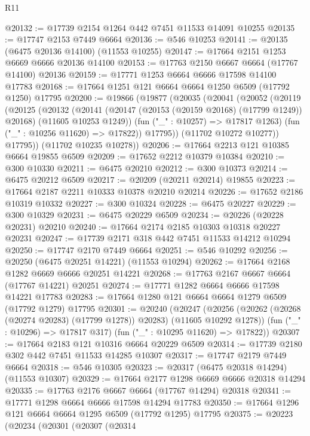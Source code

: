 \begin{lexlean}{R11}
\begin{coremodule}
{{{{{{{{{{{{{{{{{{{{{{{{{{{{{{{{{{{{{{{{{{{{{{{{{{{{{{{{{{{{{{{{{{{{{{{{{{{{{{{{{{@20132 := @17739 @2154 @1264 @442 @7451 @11533 @14091 @10255
@20135 := @17747 @2153 @7449 @6664
@20136 := @546 @10253
@20141 := @20135 (@6475 @20136 @14100) (@11553 @10255)
@20147 := @17664 @2151 @1253 @6669 @6666 @20136 @14100
@20153 := @17763 @2150 @6667 @6664 (@17767 @14100) @20136
@20159 := @17771 @1253 @6664 @6666 @17598 @14100 @17783
@20168 := @17664 @1251 @121 @6664 @6664 @1250 @6509 (@17792 @1250) @17795
@20200 := @19866
    (@19877
      (@20035
        (@20041
          (@20052
            (@20119
              (@20125
                (@20132
                  (@20141
                    (@20147 (@20153 (@20159 @20168) (@17799 @1249)) @20168)
                    (@11605 @10253 @1249))
                  (fun ("_" : @10257) => @17817 @1263)
                  (fun ("_" : @10256 @11620) => @17822))
                @17795))
            (@11702 @10272 @10277))
          @17795))
      (@11702 @10235 @10278))
@20206 := @17664 @2213 @121 @10385 @6664 @19855 @6509
@20209 := @17652 @2212 @10379 @10384
@20210 := @300 @10330
@20211 := @6475 @20210
@20212 := @300 @10373
@20214 := @6475 @20212 @6509
@20217 := @20209 (@20211 @20214) @19855
@20223 := @17664 @2187 @2211 @10333 @10378 @20210 @20214
@20226 := @17652 @2186 @10319 @10332
@20227 := @300 @10324
@20228 := @6475 @20227
@20229 := @300 @10329
@20231 := @6475 @20229 @6509
@20234 := @20226 (@20228 @20231) @20210
@20240 := @17664 @2174 @2185 @10303 @10318 @20227 @20231
@20247 := @17739 @2171 @318 @442 @7451 @11533 @14212 @10294
@20250 := @17747 @2170 @7449 @6664
@20251 := @546 @10292
@20256 := @20250 (@6475 @20251 @14221) (@11553 @10294)
@20262 := @17664 @2168 @1282 @6669 @6666 @20251 @14221
@20268 := @17763 @2167 @6667 @6664 (@17767 @14221) @20251
@20274 := @17771 @1282 @6664 @6666 @17598 @14221 @17783
@20283 := @17664 @1280 @121 @6664 @6664 @1279 @6509 (@17792 @1279) @17795
@20301 := @20240
    (@20247
      (@20256 (@20262 (@20268 (@20274 @20283) (@17799 @1278)) @20283) (@11605 @10292 @1278))
      (fun ("_" : @10296) => @17817 @317)
      (fun ("_" : @10295 @11620) => @17822))
@20307 := @17664 @2183 @121 @10316 @6664 @20229 @6509
@20314 := @17739 @2180 @302 @442 @7451 @11533 @14285 @10307
@20317 := @17747 @2179 @7449 @6664
@20318 := @546 @10305
@20323 := @20317 (@6475 @20318 @14294) (@11553 @10307)
@20329 := @17664 @2177 @1298 @6669 @6666 @20318 @14294
@20335 := @17763 @2176 @6667 @6664 (@17767 @14294) @20318
@20341 := @17771 @1298 @6664 @6666 @17598 @14294 @17783
@20350 := @17664 @1296 @121 @6664 @6664 @1295 @6509 (@17792 @1295) @17795
@20375 := @20223
    (@20234
      (@20301
        (@20307
          (@20314
}}}}}}}}}}}}}}}}}}}}}}}}}}}}}}}}}}}}}}}}}}}}}}}}}}}}}}}}}}}}}}}}}}}}}}}}}}}}}}}}}}
\end{coremodule}
\end{lexlean}
